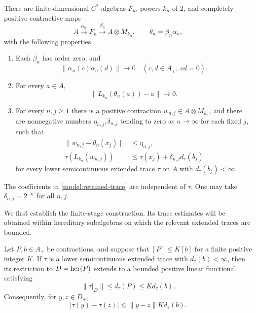 \begin{lemma}
 \label{model:construction}
There are finite-dimensional $C^*$-algebras $F_n$, powers $k_n$ of
$2$, and completely positive contractive maps
\[
 A\xrightarrow{\alpha_n}F_n
 \xrightarrow{\beta_n}A\otimes M_{k_n},
 \qquad \theta_n=\beta_n\alpha_n,
\]
with the following properties.
\begin{enumerate}
 \item Each $\beta_n$ has order zero, and
 \[
  \|\alpha_n(c)\alpha_n(d)\|\longrightarrow0
  \quad(c,d\in A_+,\ cd=0).
 \]
 \item For every $a\in A$,
 \[
  \|L_{k_n}(\theta_n(a))-a\|\longrightarrow0.
 \]
 \item For every $n,j\geq1$ there is a positive contraction
 $w_{n,j}\in A\otimes M_{k_n}$, and there are nonnegative numbers
 $\eta_{n,j},\delta_{n,j}$ tending to zero as $n\to\infty$ for each
 fixed $j$, such that
 \begin{align}
  \|w_{n,j}-\theta_n(x_j)\|&\leq\eta_{n,j},
       \label{model:retained-norm}\\
  \tau(L_{k_n}(w_{n,j}))
     &\leq \tau(x_j)+\delta_{n,j}d_\tau(b_j)
       \label{model:retained-trace}
 \end{align}
 for every lower semicontinuous extended trace $\tau$ on $A$ with
 $d_\tau(b_j)<\infty$.
\end{enumerate}
The coefficients in \eqref{model:retained-trace} are independent of
$\tau$.  One may take $\delta_{n,j}=2^{-n}$ for all $n,j$.
\end{lemma}

We first establish the finite-stage construction.  Its trace estimates
will be obtained within hereditary subalgebras on which the relevant
extended traces are bounded.

\begin{lemma}
 \label{model:corner-traces}
Let $P,b\in A_+$ be contractions, and suppose that
$[P]\leq K[b]$ for a finite positive integer $K$.  If $\tau$ is a
lower semicontinuous extended trace with $d_\tau(b)<\infty$, then
its restriction to $D=\operatorname{her}(P)$ extends to a bounded positive linear
functional satisfying
\begin{equation}
 \label{model:corner-bound}
 \|\tau|_D\|\leq d_\tau(P)\leq Kd_\tau(b).
\end{equation}
Consequently, for $y,z\in D_+$,
\begin{equation}
 \label{model:corner-error}
 |\tau(y)-\tau(z)|
    \leq \|y-z\|K d_\tau(b).
\end{equation}
\end{lemma}

